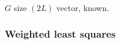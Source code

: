 \documentclass[8pt,a4paper]{scrartcl}
\begin{document}
\begin{multicols*}{3}
{$G$ size $(2L)$ vector, known.
}


\subsubsection{Weighted least squares}
























\end{multicols*}
\end{document}
